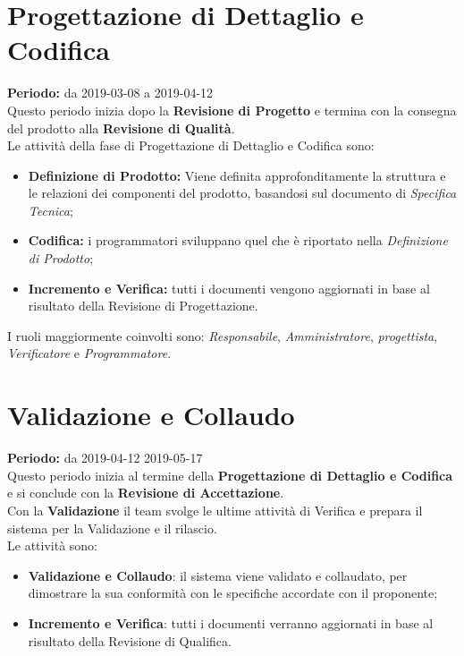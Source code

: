 \section{Progettazione di Dettaglio e Codifica}
\textbf{Periodo:} da 2019-03-08 a 2019-04-12\\
Questo periodo inizia dopo la \textbf{Revisione di Progetto} e termina con la consegna del prodotto alla \textbf{Revisione di Qualità}.\\Le attività della fase di Progettazione di Dettaglio e Codifica sono:
\begin{itemize}
    \item \textbf{Definizione di Prodotto:} Viene definita approfonditamente la struttura e le relazioni dei componenti del prodotto, basandosi sul documento di \textit{Specifica Tecnica};
    \item \textbf{Codifica:} i programmatori sviluppano quel che è riportato nella \textit{Definizione di Prodotto};
    \item \textbf{Incremento e Verifica:} tutti i documenti vengono aggiornati in base al risultato della Revisione di Progettazione.
\end{itemize}
I ruoli maggiormente coinvolti sono: \textit{Responsabile}, \textit{Amministratore}, \textit{progettista}, \textit{Verificatore} e \textit{Programmatore}.

\section{Validazione e Collaudo}
\textbf{Periodo:} da 2019-04-12 2019-05-17\\
Questo periodo inizia al termine della \textbf{Progettazione di Dettaglio e Codifica} e si conclude con la \textbf{Revisione di Accettazione}.\\Con la \textbf{Validazione} il team svolge le ultime attività di Verifica e prepara il sistema per la Validazione e il rilascio.\\
Le attività sono:
\begin{itemize}
    \item \textbf{Validazione e Collaudo}: il sistema viene validato e collaudato, per dimostrare la sua conformità con le specifiche accordate con il proponente;
    \item \textbf{Incremento e Verifica}: tutti i documenti verranno aggiornati in base al risultato della Revisione di Qualifica.
\end{itemize}
